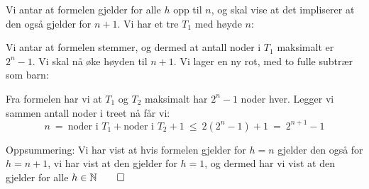 Vi antar at formelen gjelder for alle $ h $ opp til $ n $, og skal vise at det impliserer at den også gjelder for $ n+1 $. Vi har et tre $ T_1 $ med høyde $ n $:
\begin{center}
\end{center}
Vi antar at formelen stemmer, og dermed at antall noder i $ T_1 $ maksimalt er $ 2^n - 1 $. Vi skal nå øke høyden til $ n+1 $. Vi lager en ny rot, med to fulle subtrær som barn:
\begin{center}
\end{center}
Fra formelen har vi at $ T_1 $ og $ T_2 $ maksimalt har $ 2^n-1 $ noder hver. Legger vi sammen antall noder i treet nå får vi:
\[ n ~=~ \text{noder i } T_1 + \text{noder i } T_2 + 1 ~\leq~ 2(2^n -1) + 1 ~=~ 2^{n+1} - 1 \]

Oppsummering: Vi har vist at hvis formelen gjelder for $ h=n $ gjelder den også for $ h=n+1 $, vi har vist at den gjelder for $ h=1 $, og dermed har vi vist at den gjelder for alle $ h \in \mathbb{N} \hfill\qed$